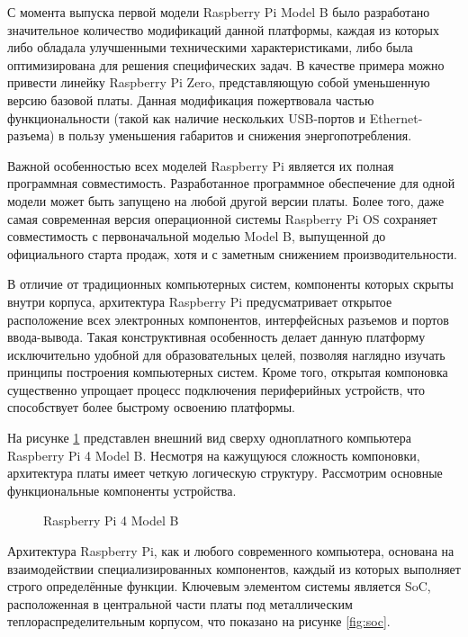С момента выпуска первой модели Raspberry Pi Model B было разработано значительное количество модификаций данной платформы, каждая из которых либо обладала улучшенными техническими характеристиками, либо была оптимизирована для решения специфических задач. В качестве примера можно привести линейку Raspberry Pi Zero, представляющую собой уменьшенную версию базовой платы. Данная модификация пожертвовала частью функциональности (такой как наличие нескольких USB-портов и Ethernet-разъема) в пользу уменьшения габаритов и снижения энергопотребления.

Важной особенностью всех моделей Raspberry Pi является их полная программная совместимость. Разработанное программное обеспечение для одной модели может быть запущено на любой другой версии платы. Более того, даже самая современная версия операционной системы Raspberry Pi OS сохраняет совместимость с первоначальной моделью Model B, выпущенной до официального старта продаж, хотя и с заметным снижением производительности.

В отличие от традиционных компьютерных систем, компоненты которых скрыты внутри корпуса, архитектура Raspberry Pi предусматривает открытое расположение всех электронных компонентов, интерфейсных разъемов и портов ввода-вывода. Такая конструктивная особенность делает данную платформу исключительно удобной для образовательных целей, позволяя наглядно изучать принципы построения компьютерных систем. Кроме того, открытая компоновка существенно упрощает процесс подключения периферийных устройств, что способствует более быстрому освоению платформы.

На рисунке \ref{fig:raspberry4B} представлен внешний вид сверху одноплатного компьютера Raspberry Pi 4 Model B. Несмотря на кажущуюся сложность компоновки, архитектура платы имеет четкую логическую структуру. Рассмотрим основные функциональные компоненты устройства.

\begin{figure}[H]
	\centering
	\caption{Raspberry Pi 4 Model B}
	\label{fig:raspberry4B}
\end{figure}

Архитектура Raspberry Pi, как и любого современного компьютера, основана на взаимодействии специализированных компонентов, каждый из которых выполняет строго определённые функции. Ключевым элементом системы является SoC, расположенная в центральной части платы под металлическим теплораспределительным корпусом, что показано на рисунке \ref{fig:soc}. 

